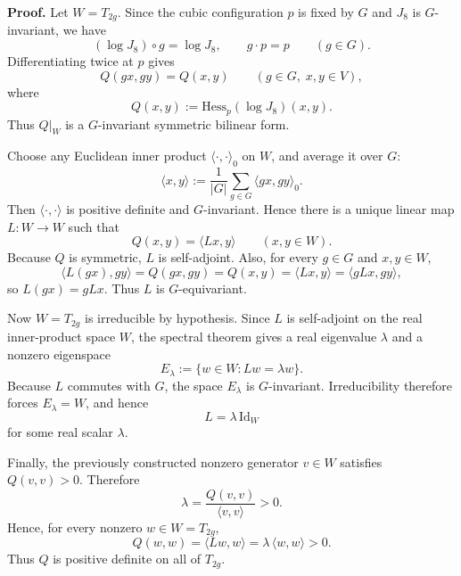 \noindent\textbf{Proof.}
Let $W=T_{2g}$. Since the cubic configuration $p$ is fixed by $G$ and $J_8$ is $G$-invariant, we have
\[
(\log J_8)\circ g=\log J_8,\qquad g\cdot p=p\qquad (g\in G).
\]
Differentiating twice at $p$ gives
\[
Q(gx,gy)=Q(x,y)\qquad (g\in G,\;x,y\in V),
\]
where
\[
Q(x,y):=\mathrm{Hess}_p(\log J_8)(x,y).
\]
Thus $Q|_W$ is a $G$-invariant symmetric bilinear form.

Choose any Euclidean inner product $\langle\cdot,\cdot\rangle_0$ on $W$, and average it over $G$:
\[
\langle x,y\rangle:=\frac{1}{|G|}\sum_{g\in G}\langle gx,gy\rangle_0.
\]
Then $\langle\cdot,\cdot\rangle$ is positive definite and $G$-invariant.
Hence there is a unique linear map $L:W\to W$ such that
\[
Q(x,y)=\langle Lx,y\rangle\qquad (x,y\in W).
\]
Because $Q$ is symmetric, $L$ is self-adjoint. Also, for every $g\in G$ and $x,y\in W$,
\[
\langle L(gx),gy\rangle
=
Q(gx,gy)
=
Q(x,y)
=
\langle Lx,y\rangle
=
\langle gLx,gy\rangle,
\]
so $L(gx)=gLx$. Thus $L$ is $G$-equivariant.

Now $W=T_{2g}$ is irreducible by hypothesis. Since $L$ is self-adjoint on the real inner-product space $W$, the spectral theorem gives a real eigenvalue $\lambda$ and a nonzero eigenspace
\[
E_\lambda:=\{w\in W:Lw=\lambda w\}.
\]
Because $L$ commutes with $G$, the space $E_\lambda$ is $G$-invariant. Irreducibility therefore forces $E_\lambda=W$, and hence
\[
L=\lambda\,\mathrm{Id}_W
\]
for some real scalar $\lambda$.

Finally, the previously constructed nonzero generator $v\in W$ satisfies $Q(v,v)>0$. Therefore
\[
\lambda=\frac{Q(v,v)}{\langle v,v\rangle}>0.
\]
Hence, for every nonzero $w\in W=T_{2g}$,
\[
Q(w,w)=\langle Lw,w\rangle=\lambda\,\langle w,w\rangle>0.
\]
Thus $Q$ is positive definite on all of $T_{2g}$.
